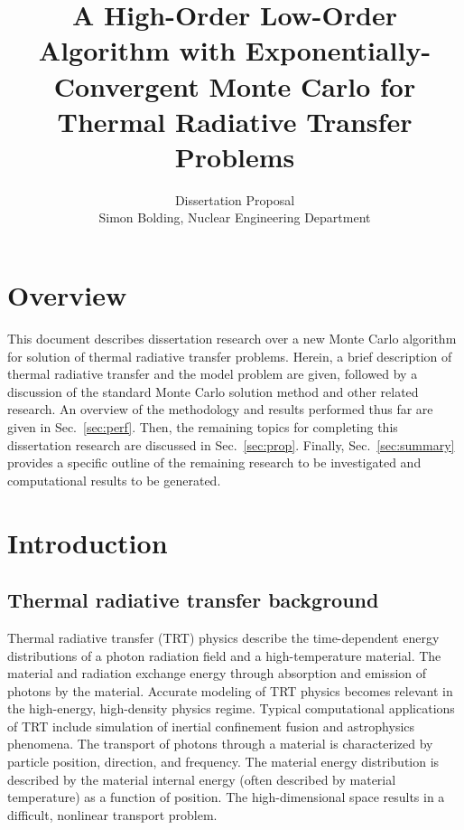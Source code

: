 \documentclass[11pt]{article}
\title{A High-Order Low-Order Algorithm with Exponentially-Convergent Monte Carlo for Thermal Radiative Transfer Problems}
\author{Dissertation Proposal \\ Simon Bolding, Nuclear Engineering Department}
\begin{document}
\singlespace
\maketitle

\doublespace
\setcounter{secnumdepth}{2}

\section{Overview}

This document describes dissertation research over a new Monte Carlo algorithm for solution of
thermal radiative
transfer problems. Herein, a brief description of thermal radiative transfer and the
model problem are given, followed by a discussion of the standard Monte Carlo
solution method and other related research.  An overview of the methodology and
results performed thus far are given in Sec.~\ref{sec:perf}. Then, the remaining topics for completing this dissertation research
are discussed in Sec.~\ref{sec:prop}.  Finally, Sec.~\ref{sec:summary} provides a specific outline of the remaining research to be
investigated and computational results to be generated.

\section{Introduction}

\subsection{Thermal radiative transfer background}

Thermal radiative transfer (TRT) physics describe the time-dependent energy distributions of a photon
radiation field and a high-temperature material.  The material and radiation exchange
energy through absorption and emission of photons by the material.  
Accurate modeling of TRT physics becomes relevant in the high-energy,
high-density physics regime. Typical computational applications of TRT include simulation of inertial confinement fusion and
astrophysics phenomena. 
 The transport of
photons through a material is characterized by particle position, direction, and
frequency.  The material energy distribution is described by the material internal
energy (often described by material temperature) as a function of position.  The
high-dimensional space results in a difficult, nonlinear transport problem.
\end{document}
